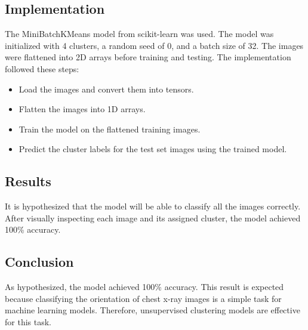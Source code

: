 \documentclass[10pt,twocolumn,letterpaper]{article}
\begin{document}
\subsection{Implementation}
The MiniBatchKMeans model from scikit-learn was used. The model was initialized with 4 clusters, a random seed of 0, and a batch size of 32. The images were flattened into 2D arrays before training and testing. The implementation followed these steps:
\begin{itemize}
    \item Load the images and convert them into tensors.
    \item Flatten the images into 1D arrays.
    \item Train the model on the flattened training images.
    \item Predict the cluster labels for the test set images using the trained model.
\end{itemize}

\subsection{Results}

It is hypothesized that the model will be able to classify all the images correctly. After visually inspecting each image and its assigned cluster, the model achieved 100\% accuracy.

\subsection{Conclusion}
As hypothesized, the model achieved 100\% accuracy. This result is expected because classifying the orientation of chest x-ray images is a simple task for machine learning models. Therefore, unsupervised clustering models are effective for this task.

{\small


}
\end{document}
